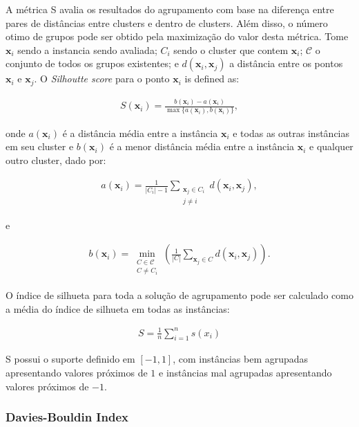  
A métrica \gls{S}  \cite{rousseeuw1987silhouettes} avalia os resultados do agrupamento com base na diferença entre pares de distâncias entre clusters e dentro de clusters. Além disso, o número otimo de grupos pode ser obtido pela maximização do valor desta métrica. Tome $\mathbf{x}_i$ sendo a instancia sendo avaliada; $C_i$ sendo  o cluster que contem $\mathbf{x}_i$; $\mathcal{C}$ o conjunto de todos os grupos existentes; e $d(\mathbf{x}_i, \mathbf{x}_j)$ a distância entre os pontos $\mathbf{x}_i$ e $\mathbf{x}_j$. O \textit{Silhoutte score} para o ponto  $\mathbf{x}_i$ is defined as:

\begin{align}\label{eq:s1}
    S(\mathbf{x}_i) = \frac{b(\mathbf{x}_i) - a(\mathbf{x}_i)}{\max\{a(\mathbf{x}_i), b(\mathbf{x}_i)\}},
\end{align}

\noindent onde $a(\mathbf{x}_i)$ é a distância média entre a instância $\mathbf{x}_i$ e todas as outras instâncias em seu cluster e $b(\mathbf{x}_i)$ é a menor distância média entre a instância $\mathbf{x}_i$ e qualquer outro cluster, dado por:

\begin{align}\label{eq:s2}
    a(\mathbf{x}_i) = \frac{1}{|C_i| - 1} \sum_{\substack{\mathbf{x}_j \in C_i \\ j \ne i}} d(\mathbf{x}_i, \mathbf{x}_j),
\end{align}

e

\begin{align}\label{eq:s3}
    b(\mathbf{x}_i) = \min_{\substack{C \in \mathcal{C} \\ C \ne C_i}} \left( \frac{1}{|C|} \sum_{\mathbf{x}_j \in C} d(\mathbf{x}_i, \mathbf{x}_j) \right).
\end{align}

O índice de silhueta para toda a solução de agrupamento pode ser calculado como a média do índice de silhueta em todas as instâncias:

\begin{align}\label{eq:s4}
S = \frac{1}{n} \sum_{i=1}^{n} s(x_i)
\end{align}

\gls{S} possui o suporte definido em $[-1,1]$, com instâncias bem agrupadas apresentando valores próximos de $1$ e instâncias mal agrupadas apresentando valores próximos de $-1$.

\subsubsection{Davies-Bouldin Index}

